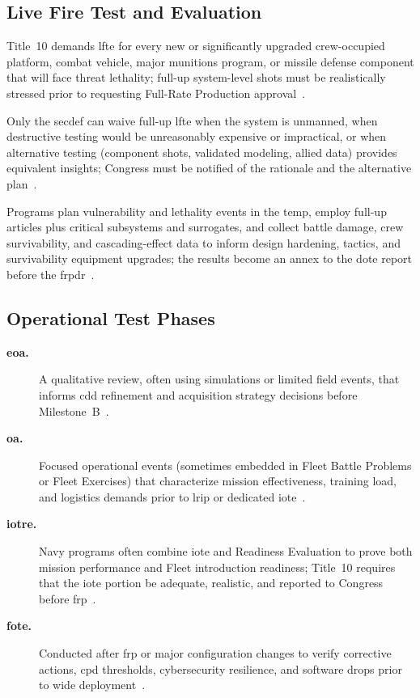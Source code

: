 \documentclass[../main.tex]{subfiles}
\begin{document}
\subsection{Live Fire Test and Evaluation}
\begin{description}[style=nextline,labelsep=0.5em,font=\bfseries]
  \item[\textbf{When required.}] Title~10 demands \ac{lfte} for every new or significantly upgraded crew-occupied platform, combat vehicle, major munitions program, or missile defense component that will face threat lethality; full-up system-level shots must be realistically stressed prior to requesting Full-Rate Production approval~\autocite{USC-10-2366,DoDI5000-89}.
  \item[\textbf{When waived.}] Only the \ac{secdef} can waive full-up \ac{lfte} when the system is unmanned, when destructive testing would be unreasonably expensive or impractical, or when alternative testing (component shots, validated modeling, allied data) provides equivalent insights; Congress must be notified of the rationale and the alternative plan~\autocite{USC-10-2366,DoDI5000-89}.
  \item[\textbf{Execution and use.}] Programs plan vulnerability and lethality events in the \ac{temp}, employ full-up articles plus critical subsystems and surrogates, and collect battle damage, crew survivability, and cascading-effect data to inform design hardening, tactics, and survivability equipment upgrades; the results become an annex to the \ac{dote} report before the \ac{frpdr}~\autocite{DoDI5000-89,DoDI5000-85}.
\end{description}

\subsection{Operational Test Phases}
\begin{description}
  \item[\textbf{\ac{eoa}.}] A qualitative review, often using simulations or limited field events, that informs \ac{cdd} refinement and acquisition strategy decisions before Milestone~B~\autocite{edo-3-5-6-test-eval-part-ii-2025}.
  \item[\textbf{\ac{oa}.}] Focused operational events (sometimes embedded in Fleet Battle Problems or Fleet Exercises) that characterize mission effectiveness, training load, and logistics demands prior to \ac{lrip} or dedicated \ac{iote}~\autocite{edo-3-5-6-test-eval-part-ii-2025}.
  \item[\textbf{\ac{iotre}.}] Navy programs often combine \ac{iote} and Readiness Evaluation to prove both mission performance and Fleet introduction readiness; Title~10 requires that the \ac{iote} portion be adequate, realistic, and reported to Congress before \ac{frp}~\autocite{USC-10-2399}.
  \item[\textbf{\ac{fote}.}] Conducted after \ac{frp} or major configuration changes to verify corrective actions, \ac{cpd} thresholds, cybersecurity resilience, and software drops prior to wide deployment~\autocite{DoDI5000-89}.
\end{description}
\end{document}
